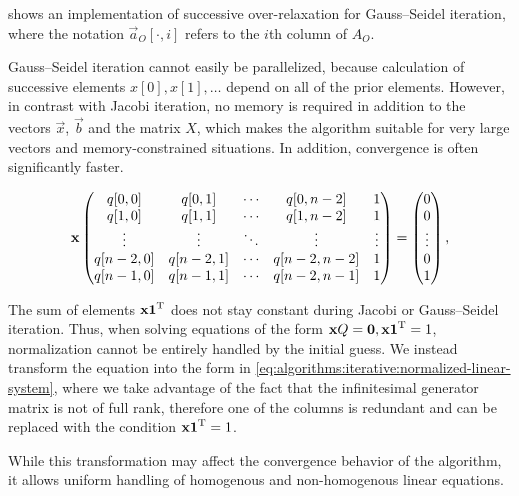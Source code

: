  shows an implementation of
successive over-relaxation for Gauss--Seidel iteration, where the
notation $\vec{a}_O[\cdot, i]$ refers to the $i$th column of $A_O$.

Gauss--Seidel iteration cannot easily be parallelized, because
calculation of successive elements $x[0], x[1], \ldots$ depend on all
of the prior elements. However, in contrast with Jacobi iteration, no
memory is required in addition to the vectors $\vec{x}$, $\vec{b}$ and
the matrix $X$, which makes the algorithm suitable for very large
vectors and memory-constrained situations. In addition, convergence is
often significantly faster.

\begin{figure}
\begin{equation}
  \label{eq:algorithms:iterative:normalized-linear-system}
  \vec{x} \begin{pmatrix}
    q[0,0] & q[0,1] & \cdots & q[0,n - 2] & 1 \\
    q[1,0] & q[1,1] & \cdots & q[1,n - 2] & 1 \\
    \vdots & \vdots & \ddots & \vdots & \vdots \\
    q[n - 2,0] & q[n - 2,1] & \cdots & q[n - 2,n - 2] & 1 \\
    q[n - 1,0] & q[n - 1,1] & \cdots & q[n - 2,n - 1] & 1 \\
  \end{pmatrix} = \begin{pmatrix}
    0 \\ 0 \\ \vdots \\ 0 \\ 1
  \end{pmatrix} \text,
\end{equation}
\end{figure}

The sum of elements $\bm{\mathrm{x}} \bm{\mathrm{1}}^{\mathrm{T}}$ does not stay constant during
Jacobi or Gauss--Seidel iteration. Thus, when solving equations of the
form $\bm{\mathrm{x}} Q = \bm{\mathrm{0}}, \bm{\mathrm{x}} \bm{\mathrm{1}}^{\mathrm{T}} = 1$, normalization
cannot be entirely handled by the initial guess. We instead transform
the equation into the form in
\cref{eq:algorithms:iterative:normalized-linear-system}, where we take
advantage of the fact that the infinitesimal generator matrix is not
of full rank, therefore one of the columns is redundant and can be
replaced with the condition $\bm{\mathrm{x}} \bm{\mathrm{1}}^{\mathrm{T}} = 1$.

While this transformation may affect the convergence behavior of the
algorithm, it allows uniform handling of homogenous and non-homogenous
linear equations.


